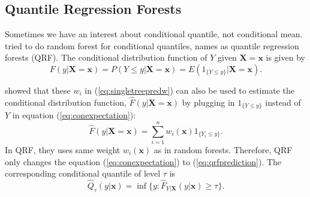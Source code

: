 \documentclass[11pt,titlepage]{article}
\begin{document}
	
	
	
	
	
	\subsection{Quantile Regression Forests}
	
	Sometimes we have an interest about conditional quantile, not conditional mean.  \citep{Meinshausen2006} tried to do random forest for conditional quantiles, names as quantile regression forests (QRF). The conditional distribution function of $Y$ given $\mathbf{X}=\mathbf{x}$ is given by
	\begin{equation}
	F(y|\mathbf{X}=\mathbf{x})=P(Y\leq y| \mathbf{X}=\mathbf{x})=E(1_{\{Y\leq y\}}|\mathbf{X}=\mathbf{x}).
	\end{equation}
	
	\citep{Meinshausen2006} showed that these $w_{i}$ in (\ref{eq:singletreepredw}) can also be used to estimate the conditional distribution function, $\hat{F}(y|\mathbf{X}=\mathbf{x})$ by plugging in $1_{\{Y\leq y\}}$ instead of $Y$ in equation (\ref{eq:conexpectation}):
	\begin{equation}\label{eq:qrfprediction}
	\hat{F}(y|\mathbf{X}=\mathbf{x})=\sum_{i=1}^{n}w_{i}(\mathbf{x})1_{\{Y_{i}\leq y\}}.
	\end{equation}
	In QRF, they uses same weight $w_{i}(\mathbf{x})$ as in random forests. Therefore, QRF only changes the equation (\ref{eq:conexpectation}) to (\ref{eq:qrfprediction}). The corresponding conditional quantile of level $\tau$ is
	\begin{equation}
	\hat{Q}_{\tau}(y|\mathbf{x})=\inf \{ y:\hat{F}_{Y|\mathbf{X}}(y|\mathbf{x})\geq \tau \}.
	\end{equation}
	
\end{document}
